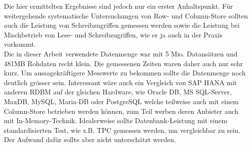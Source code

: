 Die hier ermittelten Ergebnisse sind jedoch nur ein erster Anhaltspunkt.
Für weitergehende systematische Untersuchungen von Row- und Column-Store sollten 
auch die Leistung von Schreibzugriffen gemessen werden sowie die Leistung bei Mischbetrieb 
von Lese- und Schreibzugriffen, wie er ja auch in der Praxis vorkommt.\\
Die in dieser Arbeit verwendete Datenmenge war mit 5 Mio. Datansätzen und 481MB Rohdaten recht klein.
Die gemessenen Zeiten waren daher auch nur sehr kurz. Um aussagekräftigere Messwerte
zu bekommen sollte die Datenmenge noch deutlich grösser sein.
Interessant wäre auch ein Vergleich von SAP HANA mit anderen RDBM auf der gleichen Hardware,
wie Oracle DB, MS SQL-Server, MaxDB, MySQL, Maria-DB oder PostgreSQL welche teilweise auch mit
einem Column-Store betrieben werden können, zum Teil werben deren Anbieter auch mit In-Memory-Technik.
Idealerweise sollte Datenbank-Leistung mit einem standardisierten Test,
wie z.B. TPC gemessen werden, um vergleichbar zu sein.
Der Aufwand dafür sollte aber nicht unterschätzt werden.
